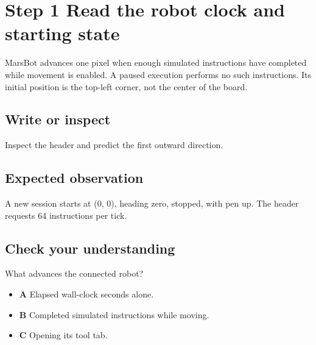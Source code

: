 \section{Step 1 Read the robot clock and starting
  state}\label{006-marsbot-square-s01-step-1-read-the-robot-clock-and-starting-state}

MarsBot advances one pixel when enough simulated instructions have
completed while movement is enabled. A paused execution performs no such
instructions. Its initial position is the top-left corner, not the
center of the board.

\subsection{Write or
  inspect}\label{006-marsbot-square-s01-write-or-inspect}

Inspect the header and predict the first outward direction.

\subsection{Expected
  observation}\label{006-marsbot-square-s01-expected-observation}

A new session starts at (0, 0), heading zero, stopped, with pen up. The
header requests 64 instructions per tick.

\subsection{Check your
  understanding}\label{006-marsbot-square-s01-check-your-understanding}

What advances the connected robot?

\begin{itemize}
  \tightlist
  \item
        \textbf{A} Elapsed wall-clock seconds alone.
  \item
        \textbf{B} Completed simulated instructions while moving.
  \item
        \textbf{C} Opening its tool tab.
\end{itemize}
